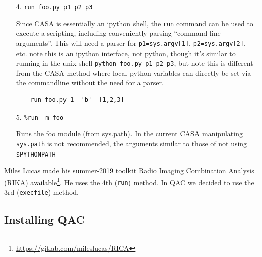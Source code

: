 \documentclass[11pt,twoside]{article}
\begin{document}
\begin{itemize}
Incidentally, if these are combined and only one script needs to be executed and then analyzed
outside of CASA, a very efficient way it to use could be to call casa from the command line,
e.g. directly from bash (or via a Makefile):

\footnotesize
\begin{verbatim}
    % casa --nogui -c foo.py a=1 b='"b"' c='[1,2,3]' > foo.log 2&>1
\end{verbatim}
\normalsize

The overhead of setting up CASA before this script really starts work
varies a lot depending on cashing and what's in the casa init files, but can
be anywhere from 5 to 20 seconds. If many of these scripts are to be run, and each
only takes a short time, the overhead is too large, and 





\item[4.]  \verb+run foo.py p1 p2 p3+

Since CASA is essentially an ipython shell, the {\tt run} command can be used to execute
a scripting, including conveniently parsing ``command line arguments''.
This will need a parser for \verb+p1=sys.argv[1]+, \verb+p2=sys.argv[2]+, etc.
note this is an ipython interface, not python, though it's similar to
running in the unix shell \verb+python foo.py p1 p2 p3+, but note this is different
from the CASA method where local python variables can directly be set via the commandline
without the need for a parser.

\footnotesize
\begin{verbatim}
    run foo.py 1  'b'  [1,2,3]
\end{verbatim}
\normalsize

                           
\item[5.]   \verb+%run -m foo+

Runs the foo module (from sys.path). In the current CASA manipulating
{\tt sys.path} is not recommended, the arguments similar to those of not
using \verb+$PYTHONPATH+

\end{itemize}

Miles Lucas made his summer-2019 toolkit Radio Imaging Combination Analysis (RIKA)
available\footnote{\url{https://gitlab.com/mileslucas/RICA}}. He uses the 4th ({\tt run}) method.
In QAC we decided to use the 3rd ({\tt execfile}) method.


\subsection{Installing QAC}
\end{document}
